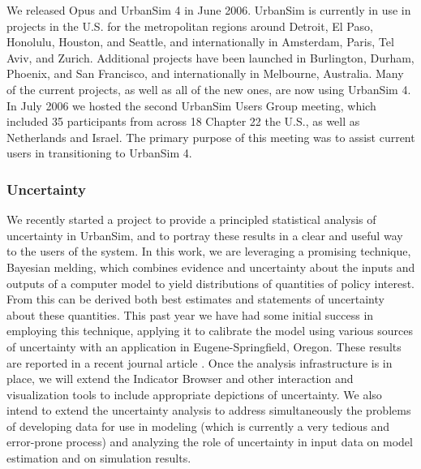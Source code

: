 We released Opus and UrbanSim 4 in June 2006. UrbanSim is currently in use
in projects in the U.S. for the metropolitan regions around Detroit, El
Paso, Honolulu, Houston, and Seattle, and internationally in Amsterdam,
Paris, Tel Aviv, and Zurich. Additional projects have been launched in
Burlington, Durham, Phoenix, and San Francisco, and internationally in
Melbourne, Australia. Many of the current projects, as well as all of the
new ones, are now using UrbanSim 4. In July 2006 we hosted the second
UrbanSim Users Group meeting, which included 35 participants from across 18
Chapter 22 the U.S., as well as Netherlands and Israel. The primary purpose
of this meeting was to assist current users in transitioning to UrbanSim 4.

\subsubsection{Uncertainty}
\label{sec:uncertainty}

We recently started a project to provide a principled statistical
analysis of uncertainty in UrbanSim, and to portray these results in
a clear and useful way to the users of the system.  In this work, we are
leveraging a promising technique, Bayesian melding,
which combines evidence and uncertainty about the inputs and outputs
of a computer model to yield distributions of quantities of policy
interest.  From this can be derived both best estimates and
statements of uncertainty about these quantities. This past year we
have had some initial success in employing this technique, applying
it to calibrate the model using various sources of uncertainty with
an application in Eugene-Springfield, Oregon. These results are
reported in a recent journal article \cite{sevcikova-trb-2006}. Once
the analysis infrastructure is in place, we will extend the
Indicator Browser and other interaction and
visualization tools to include appropriate depictions of
uncertainty.  We also intend to extend the uncertainty analysis to
address simultaneously the problems of developing data for use in
modeling (which is currently a very tedious and error-prone process)
and analyzing the role of uncertainty in input data on model
estimation and on simulation results.

